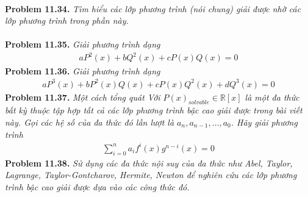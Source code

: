 \documentclass[a4paper,oneside]{book}
\numberwithin{equation}{chapter}
\begin{document}
\\
\textbf{Problem 11.34.} \textit{Tìm hiểu các lớp phương trình (nói chung) giải được nhờ các lớp phương trình trong phần này.}\\
\\
\textbf{Problem 11.35.} \textit{Giải phương trình dạng }
\begin{align}
a{P^2}\left( x \right) + b{Q^2}\left( x \right) + cP\left( x \right)Q\left( x \right) = 0
\end{align}
\textbf{Problem 11.36.} \textit{Giải phương trình dạng}
\begin{align}
a{P^3}\left( x \right) + b{P^2}\left( x \right)Q\left( x \right) + cP\left( x \right){Q^2}\left( x \right) + d{Q^3}\left( x \right) = 0
\end{align}
\textbf{Problem 11.37.} \textit{Một cách tổng quát Với $P{\left( x \right)_{solvable}} \in \mathbb{R} \left[ x \right]$ là một đa thức bất kỳ thuộc tập hợp tất cả các lớp phương trình bậc cao giải được trong bài viết này. Gọi các hệ số của đa thức đó lần lượt là ${a_n},{a_{n - 1}},\ldots,{a_0}$. Hãy giải phương trình}
\begin{align}
\sum\limits_{i = 0}^n {{a_i}{f^i}\left( x \right){g^{n - i}}\left( x \right) = 0} 
\end{align}
\textbf{Problem 11.38.} \textit{Sử dụng các đa thức nội suy của đa thức như Abel, Taylor, Lagrange, Taylor-Gontcharov, Hermite, Newton để nghiên cứu các lớp phương trình bậc cao giải được dựa vào các công thức đó.}
\end{document}
